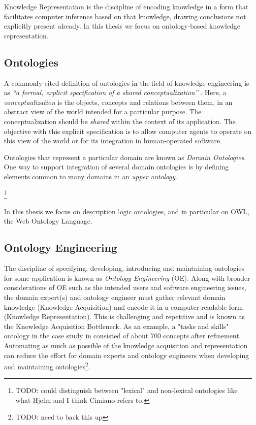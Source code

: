 \documentclass[a4paper]{report}
\newcommand{\todo}[1]{\footnote{{\color{red} TODO: #1}}}
\begin{document}
Knowledge Representation is the discipline of encoding knowledge in a form that facilitates computer inference based on that knowledge, drawing conclusions not explicitly present already.
In this thesis we focus on ontology-based knowledge representation.

\subsection{Ontologies}
\label{sec:lit-rev:ontologies}

A commonly-cited definition of ontologies in the field of knowledge engineering is as \emph{``a formal, explicit specification of a shared conceptualization''} \cite{StuderEtAl1998KEPM}.
Here, a \emph{conceptualization} is the objects, concepts and relations between them, in an abstract view of the world intended for a particular purpose.
The conceptualization should be \emph{shared} within the context of its application.
The objective with this explicit specification is to allow computer agents to operate on this view of the world or for its integration in human-operated software.

Ontologies that represent a particular domain are known as \emph{Domain Ontologies}.
One way to support integration of several domain ontologies is by defining elements common to many domains in an \emph{upper ontology}\cite{SemanticIntegration2004Noy}.

\todo{could distinguish between "lexical" and non-lexical ontologies like what Hjelm and I think Cimiano refers to.}

In this thesis we focus on description logic ontologies, and in particular on OWL, the Web Ontology Language.

\subsection{Ontology Engineering}

The discipline of specifying, developing, introducing and maintaining ontologies for some application is known as \emph{Ontology Engineering} (OE)\cite{HOO2009OntEngMeth}.
Along with broader considerations of OE such as the intended users and software engineering issues, the domain expert(s) and ontology engineer must gather relevant domain knowledge (Knowledge Acquisition) and encode it in a computer-readable form (Knowledge Representation)\cite{OntMethOverv1999}.
This is challenging and repetitive and is known as the Knowledge Acquisition Bottleneck\cite{OLforSemWeb2001}.
As an example, a "tasks and skills" ontology in the case study in \cite{HOO2009OntEngMeth} consisted of about 700 concepts after refinement.
Automating as much as possible of the knowledge acquisition and representation can reduce the effort for domain experts and ontology engineers when developing and maintaining ontologies\todo{need to back this up}.
\end{document}
